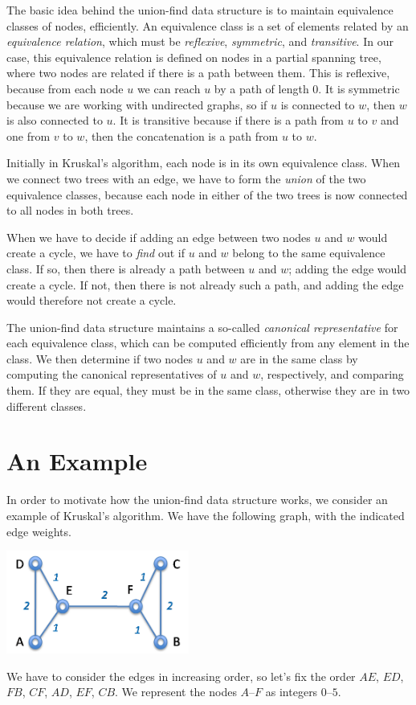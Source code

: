 The basic idea behind the union-find data structure is to maintain
equivalence classes of nodes, efficiently.  An equivalence class is a
set of elements related by an \emph{equivalence relation}, which must
be \emph{reflexive}, \emph{symmetric}, and \emph{transitive}.  In our
case, this equivalence relation is defined on nodes in a partial
spanning tree, where two nodes are related if there is a path between
them.  This is reflexive, because from each node $u$ we can reach $u$
by a path of length 0.  It is symmetric because we are working with
undirected graphs, so if $u$ is connected to $w$, then $w$ is also
connected to $u$.  It is transitive because if there is a path from
$u$ to $v$ and one from $v$ to $w$, then the concatenation is a path
from $u$ to $w$.

Initially in Kruskal's algorithm, each node is in its own equivalence
class.  When we connect two trees with an edge, we have to form the
\emph{union} of the two equivalence classes, because each node in
either of the two trees is now connected to all nodes in both trees.

When we have to decide if adding an edge between two nodes $u$ and $w$
would create a cycle, we have to \emph{find} out if $u$ and $w$ belong
to the same equivalence class.  If so, then there is already a path
between $u$ and $w$; adding the edge would create a cycle.  If not,
then there is not already such a path, and adding the edge would
therefore not create a cycle.

The union-find data structure maintains a so-called \emph{canonical
  representative} for each equivalence class, which can be computed
efficiently from any element in the class.  We then determine if two
nodes $u$ and $w$ are in the same class by computing the canonical
representatives of $u$ and $w$, respectively, and comparing them.
If they are equal, they must be in the same class, otherwise they
are in two different classes.


\section{An Example}
\label{sec:unionfind:example}

In order to motivate how the union-find data structure works,
we consider an example of Kruskal's algorithm.  We have the following
graph, with the indicated edge weights.
\begin{center}
  \includegraphics[width=0.45\textwidth]{img/graph1.png}
\end{center}
We have to consider the edges in increasing order, so let's fix the
order $AE$, $ED$, $FB$, $CF$, $AD$, $EF$, $CB$.  We represent the
nodes $A$--$F$ as integers $0$--$5$.

